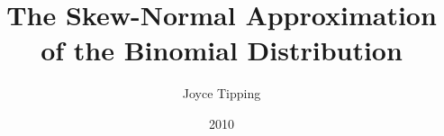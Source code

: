 \documentclass{article}
\begin{document}
\title{The Skew-Normal Approximation of the Binomial Distribution}
\author{Joyce Tipping}
\date{2010}
\maketitle
\end{document}
